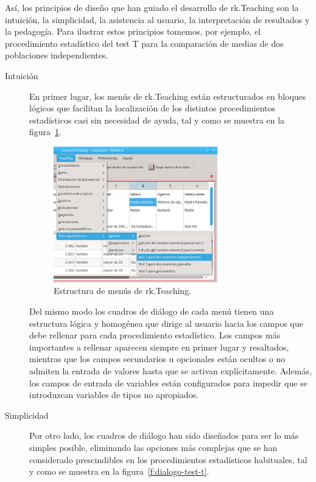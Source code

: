 \documentclass[a4paper,10pt,twoside]{article}
\newcommand{\rkteaching}{\textsf{rk.Teaching}}
\begin{document}
Así, los principios de diseño que han guiado el desarrollo de \rkteaching{} son la intuición, la simplicidad, la
asistencia al usuario, la interpretación de resultados y la pedagogía.  
Para ilustrar estos principios tomemos, por ejemplo, el procedimiento estadístico del test T para la comparación de
medias de dos poblaciones independientes.

\begin{description}
\item[Intuición] En primer lugar, los menús de \rkteaching{} están estructurados en bloques lógicos que facilitan la
localización de los distintos procedimientos estadísticos casi sin necesidad de ayuda, tal y como se muestra en la
figura~\ref{f:menu-test-t}.

\begin{figure}[htbp!]
\centering
\includegraphics[width=0.7\textwidth]{img/menu_test_t.png}
\caption{Estructura de menús de \rkteaching.}
\label{f:menu-test-t}
\end{figure}

Del mismo modo los cuadros de diálogo de cada menú tienen una estructura lógica y homogénea que dirige al usuario hacia
los campos que debe rellenar para cada procedimiento estadístico. 
Los campos más importantes a rellenar aparecen siempre en primer lugar y resaltados, mientras que los campos secundarios
u opcionales están ocultos o no admiten la entrada de valores hasta que se activan explícitamente. 
Además, los campos de entrada de variables están configurados para impedir que se introduzcan variables de tipos no
apropiados. 

\item[Simplicidad] Por otro lado, los cuadros de diálogo han sido diseñados para ser lo más simples posible,
eliminando las opciones más complejas que se han considerado prescindibles en los procedimientos estadísticos
habituales, tal y como se muestra en la figura~\ref{f:dialogo-test-t}.


\end{description}
\end{document}

